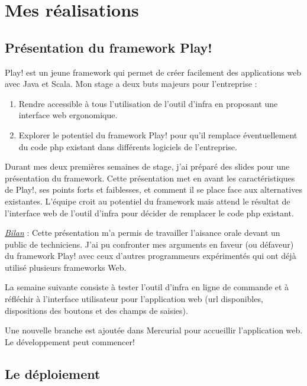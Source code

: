 
\chapter{Mes réalisations}

\section{Présentation du framework Play!}

Play! est un jeune framework qui permet de créer facilement des
applications web avec Java et Scala.
Mon stage a deux buts majeurs pour l'entreprise :

\begin{enumerate}
\item Rendre accessible à tous l'utilisation de l'outil d'infra en proposant
  une interface web ergonomique.
\item Explorer le potentiel du framework Play! pour qu'il remplace
  éventuellement du code php existant dans différents logiciels de
  l'entreprise.
\end{enumerate}

Durant mes deux premières semaines de stage, j'ai préparé des slides pour une
présentation du framework. Cette présentation met en avant les caractéristiques
de Play!, ses points forts et faiblesses, et comment il se place face aux
alternatives existantes.
L'équipe croit au potentiel du framework mais attend le résultat de
l'interface web de l'outil d'infra pour décider de remplacer le code php
existant.

\underline{\textit{Bilan}} : Cette présentation m'a permis de travailler
l'aisance orale devant un public de techniciens. J'ai pu confronter mes arguments
en faveur (ou défaveur) du framework Play! avec ceux d'autres programmeurs
expérimentés qui ont déjà utilisé plusieurs frameworks Web.

\noindent\hrulefill

La semaine suivante consiste à tester l'outil d'infra en ligne de
commande et à réfléchir à l'interface utilisateur pour l'application web (url
disponibles, dispositions des boutons et des champs de saisies).

Une nouvelle branche est ajoutée dans Mercurial pour accueillir l'application web.
Le développement peut commencer!

\section{Le déploiement}

